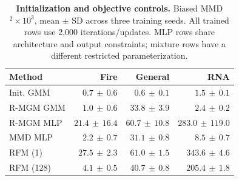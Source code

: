 \begin{table}[t]
\caption{\textbf{Initialization and objective controls.} Biased MMD$^2\times10^3$, mean $\pm$ SD across three training seeds. All trained rows use 2,000 iterations/updates. MLP rows share architecture and output constraints; mixture rows have a different restricted parameterization.}
\label{tab:ablation}
\centering\small
\setlength{\tabcolsep}{4pt}
\begin{tabular}{@{}lrrr@{}}
\toprule
Method & Fire & General & RNA \\
\midrule
Init. GMM & $0.7\,\pm\,0.6$ & $0.6\,\pm\,0.1$ & $1.5\,\pm\,0.1$ \\
R-MGM GMM & $1.0\,\pm\,0.6$ & $33.8\,\pm\,3.9$ & $2.4\,\pm\,0.2$ \\
R-MGM MLP & $21.4\,\pm\,16.4$ & $60.7\,\pm\,10.8$ & $283.0\,\pm\,119.0$ \\
MMD MLP & $2.2\,\pm\,0.7$ & $31.1\,\pm\,0.8$ & $8.5\,\pm\,0.7$ \\
RFM (1) & $27.5\,\pm\,2.3$ & $61.0\,\pm\,1.5$ & $343.6\,\pm\,4.6$ \\
RFM (128) & $4.1\,\pm\,0.5$ & $40.7\,\pm\,0.8$ & $205.4\,\pm\,1.8$ \\
\bottomrule
\end{tabular}
\end{table}
